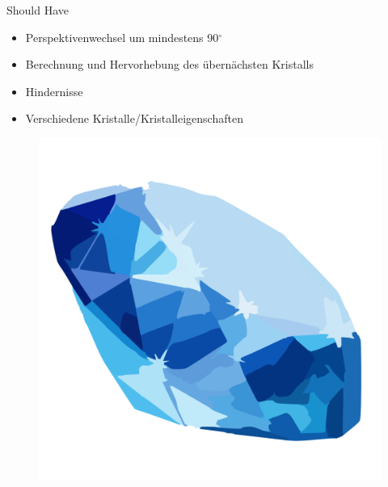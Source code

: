 \begin{frame}{Should Have}
	\onetoone
	{
		\begin{itemize}
			\item Perspektivenwechsel um mindestens 90$^\circ$
			\item Berechnung und Hervorhebung des übernächsten Kristalls
			\item Hindernisse
			\item Verschiedene Kristalle/Kristalleigenschaften
		\end{itemize}
	}
	{
		\begin{figure}
			\centering
			\includegraphics[width=\textwidth, height=0.4\textheight, keepaspectratio]{images/diamond-304884}
		\end{figure}
	}
	\begin{figure}
		\centering
		\begin{subfigure}{0.45\textwidth}
			\centering

\end{subfigure}
\end{figure}
\end{frame}
